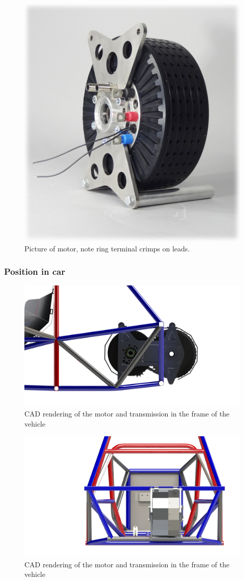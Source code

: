 \documentclass{article}
\begin{document}
\begin{figure}[H]
    \centering
    \includegraphics[width = 0.6 \textwidth]{motor_pic}
    \caption{Picture of motor, note ring terminal crimps on leads. }
    \label{motor_pic}
\end{figure}

\subsubsection{Position in car}

\begin{figure}[H]
    \centering
    \includegraphics[width = 0.8 \textwidth]{motor_side}
    \caption{CAD rendering of the motor and transmission in the frame of the vehicle}
    \label{motor_side}
\end{figure}

\begin{figure}[H]
    \centering
    \includegraphics[width = 0.8 \textwidth]{motor_rear}
    \caption{CAD rendering of the motor and transmission in the frame of the vehicle}
    \label{motor_rear}
\end{figure}
\end{document}
